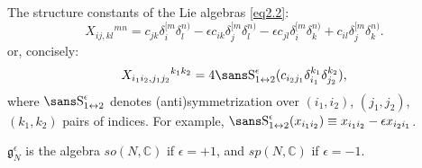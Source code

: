 \begin{description}
The structure constants of the Lie algebras \eqref{eq2.2}:
\begin{equation}
\label{eq2.5}
X_{ij,kl}{}^{mn}=c_{jk}\delta_{i}^{[m}\delta_{l}^{n)}-\epsilon c_{ik}\delta_{j}^{[m}\delta_{l}^{n)}-\epsilon c_{jl}\delta_{i}^{[m}\delta_{k}^{n)}+c_{il}\delta_{j}^{[m}\delta_{k}^{n)}.
\end{equation}
or, concisely:
\begin{equation}
\label{eq2.6}
X_{i_1i_2,j_1j_2}{}^{k_1k_2}
=4\Sym^\epsilon_{1\leftrightarrow 2}(c_{i_2j_1}\delta_{i_1}^{k_1}\delta_{j_2}^{k_2}),
\end{equation}
where $\Sym^\epsilon_{1\leftrightarrow 2}$ denotes (anti)symmetrization over
$(i_1,i_2)$, $(j_1,j_2)$, $(k_1,k_2)$ pairs of indices. For example,
 $\Sym^\epsilon_{1\leftrightarrow 2}(x_{i_1 i_2}) \equiv
 x_{i_1 i_2} - \epsilon x_{i_2 i_1}$.

$\mathfrak{g}_N^\epsilon$ is the algebra $so(N,\mathbb{C})$ if $\epsilon=+1$,
 and $sp(N,\mathbb{C})$ if $\epsilon=-1$.


\bigskip


\end{description}
